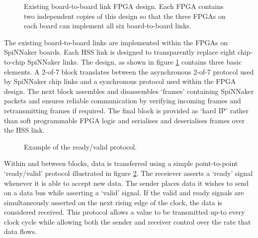 				
				\begin{figure}
					\center
					
					
					\caption[Existing board-to-board link FPGA design.]{Existing
					board-to-board link FPGA design. Each FPGA contains two independent
					copies of this design so that the three FPGAs on each board can
					implement all six board-to-board links.}
					\label{fig:existing-fpga-links}
				\end{figure}
				
				The existing board-to-board links are implemented within the FPGAs on
				SpiNNaker boards. Each HSS link is designed to transparently replace
				eight chip-to-chip SpiNNaker links. The design, as shown in figure
				\ref{fig:existing-fpga-links} contains three basic elements. A 2-of-7
				block translates between the asynchronous 2-of-7 protocol used by
				SpiNNaker chip links and a synchronous protocol used within the FPGA
				design. The next block assembles and disassembles `frames' containing
				SpiNNaker packets and ensures reliable communication by verifying
				incoming frames and retransmitting frames if required. The final block
				is provided as `hard IP' rather than soft programmable FPGA logic and
				serialises and deserialises frames over the HSS link.
				
				\begin{figure}
					\center
					\begin{tikzpicture}[thick]
						
					\end{tikzpicture}
					
					\caption{Example of the ready/valid protocol.}
					\label{fig:rdyvld-protocol}
				\end{figure}
				
				Within and between blocks, data is transferred using a simple
				point-to-point `ready/valid' protocol illustrated in figure
				\ref{fig:rdyvld-protocol}.  The receiever asserts a `ready' signal
				whenever it is able to accept new data. The sender places data it wishes
				to send on a data bus while asserting a `valid' signal. If the valid and
				ready signals are simultaneously asserted on the next rising edge of the
				clock, the data is considered received. This protocol allows a value to
				be transmitted up-to every clock cycle while allowing both the sender
				and receiver control over the rate that data flows.
			
